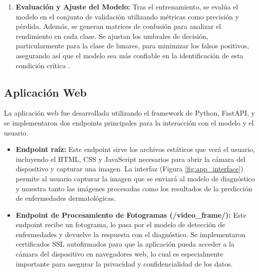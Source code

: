 \documentclass{article}
\begin{document}
\begin{enumerate}
	\item \textbf{Evaluación y Ajuste del Modelo:} Tras el entrenamiento, se evalúa el modelo en el conjunto de validación utilizando métricas como precisión y pérdida. Además, se generan matrices de confusión para analizar el rendimiento en cada clase. Se ajustan los umbrales de decisión, particularmente para la clase de lunares, para minimizar los falsos positivos, asegurando así que el modelo sea más confiable en la identificación de esta condición crítica \cite{esteva2017dermatologist}.
\end{enumerate}

\subsection{Aplicación Web}

La aplicación web fue desarrollada utilizando el framework de Python, FastAPI, y se implementaron dos endpoints principales para la interacción con el modelo y el usuario.

\begin{itemize}
	\item \textbf{Endpoint raíz:} Este endpoint sirve los archivos estáticos que verá el usuario, incluyendo el HTML, CSS y JavaScript necesarios para abrir la cámara del dispositivo y capturar una imagen. La interfaz (Figura \ref{fig:app_interface}) permite al usuario capturar la imagen que se enviará al modelo de diagnóstico y muestra tanto las imágenes procesadas como los resultados de la predicción de enfermedades dermatológicas.
	
	\item \textbf{Endpoint de Procesamiento de Fotogramas (/video\_frame/):} Este endpoint recibe un fotograma, lo pasa por el modelo de detección de enfermedades y devuelve la respuesta con el diagnóstico. Se implementaron certificados SSL autofirmados para que la aplicación pueda acceder a la cámara del dispositivo en navegadores web, lo cual es especialmente importante para asegurar la privacidad y confidencialidad de los datos.
\end{itemize}
\end{document}
